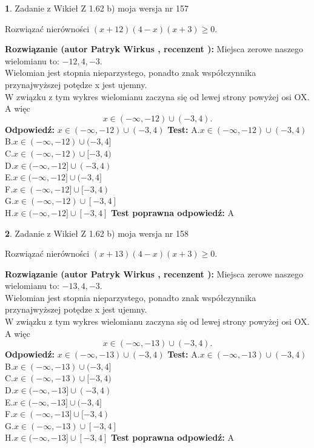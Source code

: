 \documentclass[12pt, a4paper]{article}
\theoremstyle{definition} %
\newtheorem{zad}{}
\newcommand{\zadStart}[1]{\begin{zad}#1\newline}
\newcommand{\zadStop}{\end{zad}}
\newcommand{\rozwStart}[2]{\noindent \textbf{Rozwiązanie (autor #1 , recenzent #2): }\newline}
\newcommand{\rozwStop}{\newline}
\newcommand{\odpStart}{\noindent \textbf{Odpowiedź:}\newline}
\newcommand{\odpStop}{\newline}
\newcommand{\testStart}{\noindent \textbf{Test:}\newline}
\newcommand{\testStop}{\newline}
\newcommand{\kluczStart}{\noindent \textbf{Test poprawna odpowiedź:}\newline}
\newcommand{\kluczStop}{\newline}
\begin{document}
\zadStart{Zadanie z Wikieł Z 1.62 b) moja wersja nr 157}

Rozwiązać nierówności $(x+12)(4-x)(x+3)\ge0$.
\zadStop
\rozwStart{Patryk Wirkus}{}
Miejsca zerowe naszego wielomianu to: $-12, 4, -3$.\\
Wielomian jest stopnia nieparzystego, ponadto znak współczynnika przy\linebreak najwyższej potędze x jest ujemny.\\ W związku z tym wykres wielomianu zaczyna się od lewej strony powyżej osi OX. A więc $$x \in (-\infty,-12) \cup (-3,4).$$
\rozwStop
\odpStart
$x \in (-\infty,-12) \cup (-3,4)$
\odpStop
\testStart
A.$x \in (-\infty,-12) \cup (-3,4)$\\
B.$x \in (-\infty,-12) \cup (-3,4]$\\
C.$x \in (-\infty,-12) \cup [-3,4)$\\
D.$x \in (-\infty,-12] \cup (-3,4)$\\
E.$x \in (-\infty,-12] \cup (-3,4]$\\
F.$x \in (-\infty,-12] \cup [-3,4)$\\
G.$x \in (-\infty,-12) \cup [-3,4]$\\
H.$x \in (-\infty,-12] \cup [-3,4]$
\testStop
\kluczStart
A
\kluczStop



\zadStart{Zadanie z Wikieł Z 1.62 b) moja wersja nr 158}

Rozwiązać nierówności $(x+13)(4-x)(x+3)\ge0$.
\zadStop
\rozwStart{Patryk Wirkus}{}
Miejsca zerowe naszego wielomianu to: $-13, 4, -3$.\\
Wielomian jest stopnia nieparzystego, ponadto znak współczynnika przy\linebreak najwyższej potędze x jest ujemny.\\ W związku z tym wykres wielomianu zaczyna się od lewej strony powyżej osi OX. A więc $$x \in (-\infty,-13) \cup (-3,4).$$
\rozwStop
\odpStart
$x \in (-\infty,-13) \cup (-3,4)$
\odpStop
\testStart
A.$x \in (-\infty,-13) \cup (-3,4)$\\
B.$x \in (-\infty,-13) \cup (-3,4]$\\
C.$x \in (-\infty,-13) \cup [-3,4)$\\
D.$x \in (-\infty,-13] \cup (-3,4)$\\
E.$x \in (-\infty,-13] \cup (-3,4]$\\
F.$x \in (-\infty,-13] \cup [-3,4)$\\
G.$x \in (-\infty,-13) \cup [-3,4]$\\
H.$x \in (-\infty,-13] \cup [-3,4]$
\testStop
\kluczStart
A
\kluczStop
\end{document}
